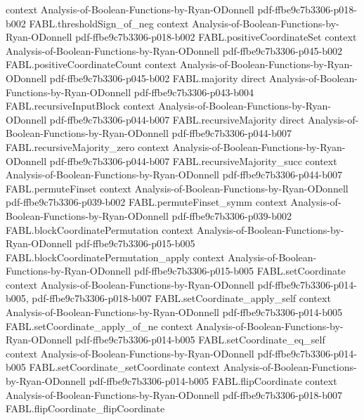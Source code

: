 \begin{theorem}
  {context}
  {Analysis-of-Boolean-Functions-by-Ryan-ODonnell}
  {pdf-ffbe9c7b3306-p018-b002}
\proofstep
  {FABL.thresholdSign_of_neg}
  {context}
  {Analysis-of-Boolean-Functions-by-Ryan-ODonnell}
  {pdf-ffbe9c7b3306-p018-b002}
\proofstep
  {FABL.positiveCoordinateSet}
  {context}
  {Analysis-of-Boolean-Functions-by-Ryan-ODonnell}
  {pdf-ffbe9c7b3306-p045-b002}
\proofstep
  {FABL.positiveCoordinateCount}
  {context}
  {Analysis-of-Boolean-Functions-by-Ryan-ODonnell}
  {pdf-ffbe9c7b3306-p045-b002}
\proofstep
  {FABL.majority}
  {direct}
  {Analysis-of-Boolean-Functions-by-Ryan-ODonnell}
  {pdf-ffbe9c7b3306-p043-b004}
\proofstep
  {FABL.recursiveInputBlock}
  {context}
  {Analysis-of-Boolean-Functions-by-Ryan-ODonnell}
  {pdf-ffbe9c7b3306-p044-b007}
\proofstep
  {FABL.recursiveMajority}
  {direct}
  {Analysis-of-Boolean-Functions-by-Ryan-ODonnell}
  {pdf-ffbe9c7b3306-p044-b007}
\proofstep
  {FABL.recursiveMajority_zero}
  {context}
  {Analysis-of-Boolean-Functions-by-Ryan-ODonnell}
  {pdf-ffbe9c7b3306-p044-b007}
\proofstep
  {FABL.recursiveMajority_succ}
  {context}
  {Analysis-of-Boolean-Functions-by-Ryan-ODonnell}
  {pdf-ffbe9c7b3306-p044-b007}
\proofstep
  {FABL.permuteFinset}
  {context}
  {Analysis-of-Boolean-Functions-by-Ryan-ODonnell}
  {pdf-ffbe9c7b3306-p039-b002}
\proofstep
  {FABL.permuteFinset_symm}
  {context}
  {Analysis-of-Boolean-Functions-by-Ryan-ODonnell}
  {pdf-ffbe9c7b3306-p039-b002}
\proofstep
  {FABL.blockCoordinatePermutation}
  {context}
  {Analysis-of-Boolean-Functions-by-Ryan-ODonnell}
  {pdf-ffbe9c7b3306-p015-b005}
\proofstep
  {FABL.blockCoordinatePermutation_apply}
  {context}
  {Analysis-of-Boolean-Functions-by-Ryan-ODonnell}
  {pdf-ffbe9c7b3306-p015-b005}
\proofstep
  {FABL.setCoordinate}
  {context}
  {Analysis-of-Boolean-Functions-by-Ryan-ODonnell}
  {pdf-ffbe9c7b3306-p014-b005,
    pdf-ffbe9c7b3306-p018-b007}
\proofstep
  {FABL.setCoordinate_apply_self}
  {context}
  {Analysis-of-Boolean-Functions-by-Ryan-ODonnell}
  {pdf-ffbe9c7b3306-p014-b005}
\proofstep
  {FABL.setCoordinate_apply_of_ne}
  {context}
  {Analysis-of-Boolean-Functions-by-Ryan-ODonnell}
  {pdf-ffbe9c7b3306-p014-b005}
\proofstep
  {FABL.setCoordinate_eq_self}
  {context}
  {Analysis-of-Boolean-Functions-by-Ryan-ODonnell}
  {pdf-ffbe9c7b3306-p014-b005}
\proofstep
  {FABL.setCoordinate_setCoordinate}
  {context}
  {Analysis-of-Boolean-Functions-by-Ryan-ODonnell}
  {pdf-ffbe9c7b3306-p014-b005}
\proofstep
  {FABL.flipCoordinate}
  {context}
  {Analysis-of-Boolean-Functions-by-Ryan-ODonnell}
  {pdf-ffbe9c7b3306-p018-b007}
\proofstep
  {FABL.flipCoordinate_flipCoordinate}

\end{theorem}
